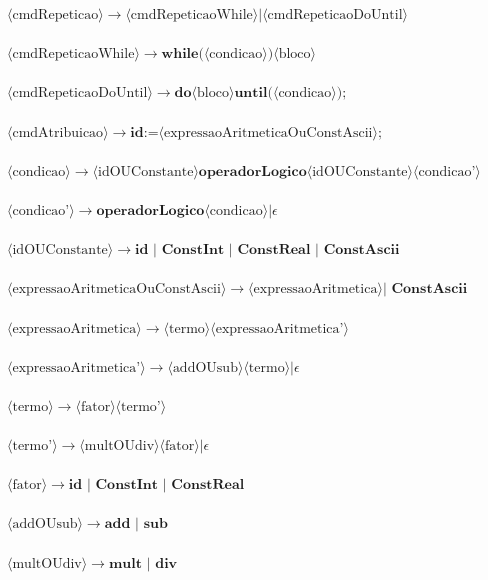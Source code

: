 \documentclass[11pt]{article}
\begin{document}
$\langle\text{cmdRepeticao}\rangle \rightarrow \langle\text{cmdRepeticaoWhile}\rangle|\langle\text{cmdRepeticaoDoUntil}\rangle$\\\\
$\langle\text{cmdRepeticaoWhile}\rangle \rightarrow \textbf{while(} \langle\text{condicao}\rangle \textbf{)} \langle\text{bloco}\rangle $\\\\
$\langle\text{cmdRepeticaoDoUntil}\rangle \rightarrow \textbf{do} \langle\text{bloco}\rangle \textbf{until(} \langle\text{condicao}\rangle \textbf{)} \textbf{;}$\\\\
$\langle\text{cmdAtribuicao}\rangle \rightarrow  \textbf{id} \textbf{:=} \langle\text{expressaoAritmeticaOuConstAscii}\rangle \textbf{;} $\\\\
$\langle\text{condicao}\rangle \rightarrow  \langle\text{idOUConstante}\rangle \textbf{operadorLogico}   \langle\text{idOUConstante}\rangle \langle\text{condicao'}\rangle $\\\\
$\langle\text{condicao'}\rangle \rightarrow  \textbf{operadorLogico} \langle\text{condicao}\rangle | \epsilon $\\\\
$\langle\text{idOUConstante}\rangle \rightarrow  \textbf{id }|  \textbf{ ConstInt } | \textbf{ ConstReal } | \textbf{ ConstAscii}$\\\\
$\langle\text{expressaoAritmeticaOuConstAscii}\rangle \rightarrow \langle\text{expressaoAritmetica}\rangle | \textbf{ ConstAscii}$\\\\
$\langle\text{expressaoAritmetica}\rangle \rightarrow  \langle\text{termo}\rangle \langle\text{expressaoAritmetica'}\rangle$\\\\
$\langle\text{expressaoAritmetica'}\rangle \rightarrow \langle\text{addOUsub}\rangle \langle\text{termo}\rangle | \epsilon $\\\\
$\langle\text{termo}\rangle \rightarrow \langle\text{fator}\rangle \langle\text{termo'}\rangle $\\\\
$\langle\text{termo'}\rangle \rightarrow \langle\text{multOUdiv}\rangle \langle\text{fator}\rangle | \epsilon $\\\\
$\langle\text{fator}\rangle \rightarrow \textbf{id }| \textbf{ ConstInt } | \textbf{ ConstReal } $\\\\
$\langle\text{addOUsub}\rangle \rightarrow  \textbf{add } | \textbf{ sub}$ \\\\
$\langle\text{multOUdiv}\rangle \rightarrow  \textbf{mult } | \textbf{ div}$ \\\\
\end{document}
